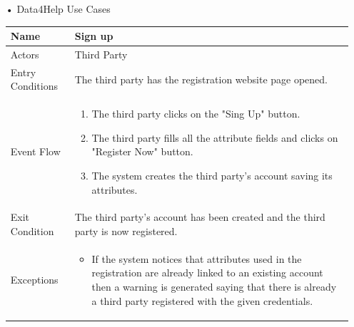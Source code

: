 \begin{enumerate}
\FloatBarrier
\item[•]{\Large Data4Help Use Cases}

\begin{table}[h]
\begin{tabular}{|l|p{}|}
\hline
Name             & Sign up \\ \hline
Actors           & Third Party  \\ \hline
Entry Conditions & The third party has the registration website page opened.    \\ \hline
Event Flow       & \begin{enumerate}
            \item The third party clicks on the "Sing Up" button.
            \item The third party fills all the attribute fields and clicks on "Register Now" button.
            \item The system creates the third party's account saving its attributes.
        \end{enumerate}\\ \hline
Exit Condition   & The third party's account has been created and the third party is now registered.\\ \hline
Exceptions       & \begin{itemize}
\item If the system notices that attributes used in the registration are already linked to an existing account then a warning is generated saying that there is already a third party registered with the given credentials.
\end{itemize}\\ \hline
\end{tabular}
\end{table}
\FloatBarrier


\end{enumerate}
